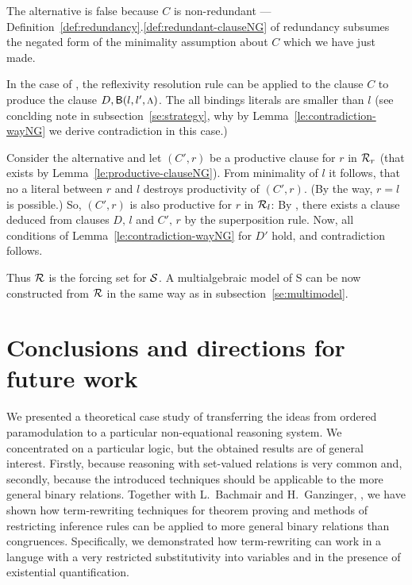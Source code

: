 \begin{PROOF}
The alternative  is false because $C$ is non-redundant ---
Definition~\ref {def:redundancy}.\ref{def:redundant-clauseNG} 
of redundancy subsumes the negated form
of the minimality assumption about $C$ which we have just made.

In the case of , the reflexivity resolution rule can be applied to the
clause $C$ to produce the clause \(D,{\sf B}(l,l',\mbox{\footnotesize$\Lambda$})\).  The all bindings
literals are smaller than $l$ (see conclding note in subsection~\ref {se:strategy}, 
why by Lemma~\ref {le:contradiction-wayNG} we derive contradiction in this case.)

Consider the alternative  and let \((C',r)\) be a productive clause
for $r$ in \(\mbox {$\cal R$}_r\) (that exists by Lemma~\ref {le:productive-clauseNG}).
From minimality of $l$ it follows, that no a literal between $r$ and $l$
destroys productivity of $(C',r)$. (By the way, \(r=l\) is possible.)  So,
$(C',r)$ is also productive for $r$ in \(\mbox {$\cal R$}_l\):
By , there exists a clause
deduced from clauses $D,\,l$ and $C',\,r$ by the superposition rule.  Now,
all conditions of Lemma~\ref {le:contradiction-wayNG} for $D'$ hold, and
contradiction follows.
\end{PROOF}
\noindent
Thus $\mbox {$\cal R$}$ is the forcing set for $\mbox {$\cal S$}$. 
A multialgebraic model of \C S can be now constructed from $\mbox {$\cal R$}$ 
in the same way as in subsection~\ref{se:multimodel}.

\section{Conclusions and directions for future work}

We presented a theoretical case study of transferring the ideas from ordered
paramodulation to a particular non-equational reasoning system.  We
concentrated on a particular logic, but the obtained results are of general
interest. Firstly, because reasoning with set-valued relations is very common
and, secondly, because the introduced techniques should be applicable to the
more general binary relations.  Together with L.~Bachmair and H.~Ganzinger,
\cite {BG249,BG-Oslo}, we have shown how term-rewriting techniques for
theorem proving and methods of restricting inference rules can be applied to
more general binary relations than congruences.  Specifically, we
demonstrated how term-rewriting can work in a languge with a very restricted
substitutivity into variables and in the presence of existential
quantification.

